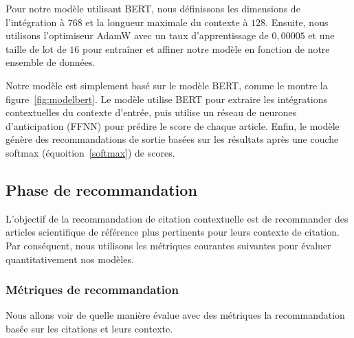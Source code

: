     \par Pour notre modèle utilisant BERT, nous définissons les dimensions de l'intégration à $768$ et la longueur maximale du contexte à $128$. Ensuite, nous utilisons l'optimiseur AdamW \cite{ch3adamw} avec un taux d'apprentissage de $0,00005$ et une taille de lot de $16$ pour entraîner et affiner notre modèle en fonction de notre ensemble de données.
    
    \par Notre modèle est simplement basé sur le modèle BERT\cite{ch2bert}, comme le montre la figure~\ref{fig:modelbert}. Le modèle utilise BERT pour extraire les intégrations contextuelles du contexte d'entrée, puis utilise un réseau de neurones d'anticipation (FFNN) pour prédire le score de chaque article. Enfin, le modèle génère des recommandations de sortie basées sur les résultats après une couche softmax (équoition~\ref{softmax}) de scores. 
    
            
    
    
    \subsection{Phase de recommandation }    
    \par L'objectif de la recommandation de citation contextuelle est de recommander des articles scientifique de référence plus pertinents pour leurs contexte de citation. Par conséquent, nous utilisons les métriques courantes suivantes pour évaluer quantitativement nos modèles.
    
    \subsubsection{Métriques de recommandation}
    \par Nous allons voir de quelle manière évalue avec des métriques la recommandation basée sur les citations et leurs contexte.
    
